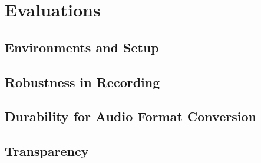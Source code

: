 \chapter{Evaluations}

\section{Environments and Setup}

\section{Robustness in Recording}

\section{Durability for Audio Format Conversion}

\section{Transparency}

